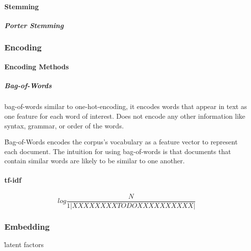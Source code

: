 \paragraph{Stemming}


\subparagraph{Porter Stemming}

\subsubsection{Encoding}

\paragraph{Encoding Methods}

\subparagraph{Bag-of-Words}

\r{{bag-of-words} similar to one-hot-encoding, it encodes words that appear in text as one feature for each word of interest. Does not encode any other information like syntax, grammar, or order of the words.}

\r{Bag-of-Words encodes the corpus's vocabulary as a feature vector to represent each document. The intuition for using bag-of-words is that documents that contain similar words are likely to be similar to one another.}


\paragraph{tf-idf}


\begin{equation}
{log\frac{N}{1|XXXXXXXXTODOXXXXXXXXXX|}}
\label{eq:tf_idf_def}
\end{equation}

\subsubsection{Embedding}


\r{latent factors}

